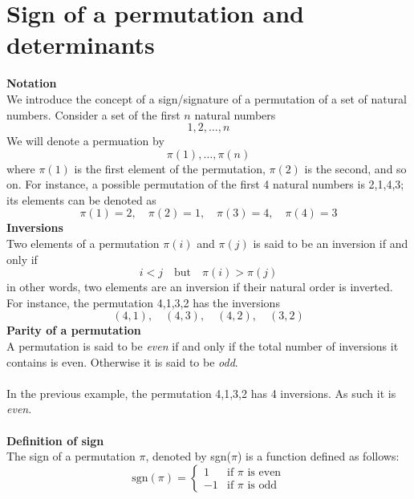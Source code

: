\documentclass{report}
\begin{document}
\section{Sign of a permutation and determinants}
\textbf{Notation}\\
We introduce the concept of a sign/signature of a permutation of a set of natural numbers. Consider a set of the first $n$ natural numbers
\begin{equation*}
1,2,\ldots,n
\end{equation*}
We will denote a permuation by
\begin{equation*}
\pi(1),\ldots,\pi(n)
\end{equation*}
where $\pi(1)$ is the first element of the permutation, $\pi(2)$ is the second, and so on. For instance, a possible permutation of the first 4 natural numbers is 2,1,4,3;
its elements can be denoted as 
\begin{equation*}
\pi(1)=2,\quad\pi(2)=1,\quad\pi(3)=4,\quad\pi(4)=3
\end{equation*}
\textbf{Inversions}\\
Two elements of a permutation $\pi(i)$ and $\pi(j)$ is said to be an inversion if and only if
\begin{equation*}
i<j\quad\text{but}\quad\pi(i)>\pi(j)
\end{equation*}
in other words, two elements are an inversion if their natural order is inverted. For instance, the permutation 4,1,3,2 has the inversions
\begin{equation*}
(4,1),\quad(4,3),\quad(4,2),\quad(3,2)
\end{equation*}
\textbf{Parity of a permutation}\\
A permutation is said to be \textit{even} if and only if the total number of inversions it contains is even. Otherwise it is said to be \textit{odd}.\\
\vspace{1mm}\\
In the previous example, the permutation 4,1,3,2 has 4 inversions. As such it is \textit{even}.\\
\vspace{1mm}\\
\textbf{Definition of sign}\\
The sign of a permutation $\pi$, denoted by sgn($\pi$) is a function defined as follows:
\begin{equation*}
\text{sgn}(\pi)=\begin{cases}
1&\text{if $\pi$ is even}\\
-1&\text{if $\pi$ is odd}\end{cases}
\end{equation*}
\end{document}
